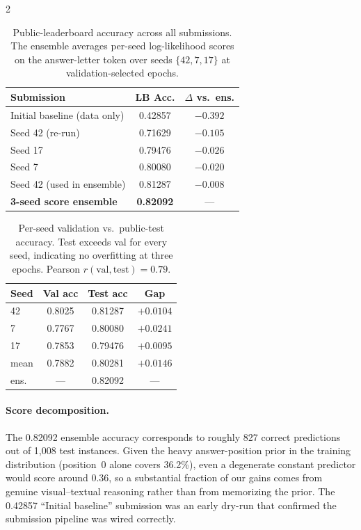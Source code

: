 \documentclass[11pt,a4paper]{article}
\begin{document}
\begin{multicols}{2}
\begin{table}[H]
\centering
\small
\setlength{\tabcolsep}{4pt}
\begin{tabular}{lcc}
\toprule
\textbf{Submission} & \textbf{LB Acc.} & \textbf{$\Delta$ vs.\ ens.} \\
\midrule
Initial baseline (data only)        & 0.42857 & $-0.392$ \\
Seed 42 (re-run)                     & 0.71629 & $-0.105$ \\
Seed 17                              & 0.79476 & $-0.026$ \\
Seed 7                               & 0.80080 & $-0.020$ \\
Seed 42 (used in ensemble)           & 0.81287 & $-0.008$ \\
\textbf{3-seed score ensemble}      & \textbf{0.82092} & --- \\
\bottomrule
\end{tabular}
\caption{Public-leaderboard accuracy across all submissions. The ensemble averages per-seed log-likelihood scores on the answer-letter token over seeds $\{42, 7, 17\}$ at validation-selected epochs.}
\label{tab:results}
\end{table}

\begin{table}[H]
\centering
\small
\setlength{\tabcolsep}{4pt}
\begin{tabular}{lccc}
\toprule
\textbf{Seed} & \textbf{Val acc} & \textbf{Test acc} & \textbf{Gap} \\
\midrule
42 & 0.8025 & 0.81287 & $+0.0104$ \\
7  & 0.7767 & 0.80080 & $+0.0241$ \\
17 & 0.7853 & 0.79476 & $+0.0095$ \\
\midrule
mean & 0.7882 & 0.80281 & $+0.0146$ \\
ens. & ---    & 0.82092 & --- \\
\bottomrule
\end{tabular}
\caption{Per-seed validation vs.\ public-test accuracy. Test exceeds val for every seed, indicating no overfitting at three epochs. Pearson $r(\text{val},\text{test})=0.79$.}
\label{tab:seeds}
\end{table}

\paragraph{Score decomposition.} The 0.82092 ensemble accuracy corresponds to roughly 827 correct predictions out of 1{,}008 test instances. Given the heavy answer-position prior in the training distribution (position~0 alone covers 36.2\%), even a degenerate constant predictor would score around 0.36, so a substantial fraction of our gains comes from genuine visual--textual reasoning rather than from memorizing the prior. The 0.42857 ``Initial baseline'' submission was an early dry-run that confirmed the submission pipeline was wired correctly.


\end{multicols}
\end{document}
